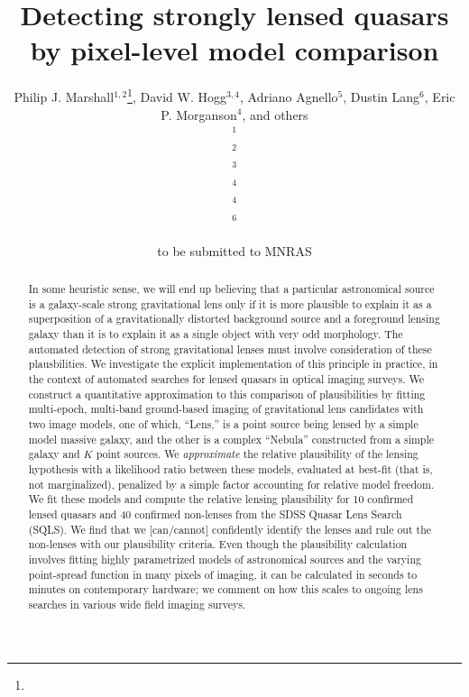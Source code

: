 \documentclass[useAMS,usenatbib]{mn2e}
\title[Finding lensed quasars]
{Detecting strongly lensed quasars by pixel-level model comparison}
\author[]{%
  Philip J. Marshall$^{1,2}$\thanks{\pjmemail},
  David W. Hogg$^{3,4}$,
  Adriano Agnello$^{5}$,
  Dustin Lang$^{6}$,
  Eric P. Morganson$^{4}$,
  and others 
  \medskip\\
  $^1$\kipac\\
  $^2$\oxford\\
  $^3$\nyu\\
  $^4$\mpia\\
  $^4$\ucsb\\
  $^6$\cmu
}
\begin{document}
             
\date{to be submitted to MNRAS}
             
\pagerange{\pageref{firstpage}--\pageref{lastpage}}

\maketitle           

\label{firstpage}


\begin{abstract}
In some heuristic sense, we will end up believing that a particular
astronomical source is a galaxy-scale strong gravitational lens only if it
is more plausible to explain it as a superposition of a gravitationally
distorted background source and a foreground lensing galaxy than it is to
explain it as a single object with very odd morphology. The automated
detection of strong gravitational lenses must involve consideration of
these plausbilities.
%
We investigate the explicit implementation of this principle in practice,
in the context of automated searches for lensed quasars in optical imaging
surveys. We construct a quantitative approximation to this comparison of
plausibilities by fitting multi-epoch, multi-band ground-based imaging of
gravitational lens candidates with two image models, one of which,
``Lens,'' is a point source being lensed by a simple model massive galaxy,
and the other is a complex ``Nebula'' constructed from a simple galaxy and
$K$ point sources.  We \emph{approximate} the relative plausibility of the
lensing hypothesis with a likelihood ratio between these models, evaluated
at best-fit (that is, not marginalized), penalized by a simple factor
accounting for relative model freedom. 
%
We fit these models and compute the relative lensing plausibility for 10
confirmed lensed quasars and 40 confirmed non-lenses from the SDSS Quasar
Lens Search (SQLS).  We find that we [can/cannot] confidently identify the
lenses and rule out the non-lenses with our plausibility criteria.  Even
though the plausibility calculation involves fitting highly parametrized
models of astronomical sources and the varying point-spread function in
many pixels of imaging, it can be calculated in seconds to minutes on
contemporary hardware; we comment on how this scales to ongoing lens
searches in various wide field imaging surveys.
\end{abstract}
\end{document}
